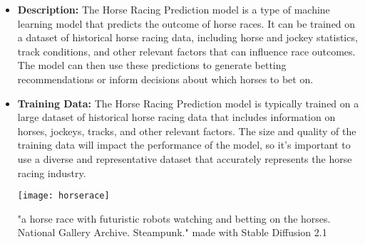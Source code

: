 \begin{itemize}
\item \textbf{Description:} The Horse Racing Prediction model is a type of machine learning model that predicts the outcome of horse races. It can be trained on a dataset of historical horse racing data, including horse and jockey statistics, track conditions, and other relevant factors that can influence race outcomes. The model can then use these predictions to generate betting recommendations or inform decisions about which horses to bet on.
\item \textbf{Training Data:} The Horse Racing Prediction model is typically trained on a large dataset of historical horse racing data that includes information on horses, jockeys, tracks, and other relevant factors. The size and quality of the training data will impact the performance of the model, so it's important to use a diverse and representative dataset that accurately represents the horse racing industry.

\begin{pdf}
\begin{marginfigure}[-5.5cm]
        \texttt{[image: horserace]}
        \caption{"a horse race with futuristic robots watching and betting on the horses. National Gallery Archive. Steampunk." made with Stable Diffusion 2.1}
\end{marginfigure}
\end{pdf}


\end{itemize}
